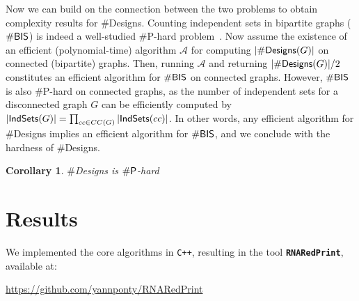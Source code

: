 \documentclass[twocolumn]{bmcart}%
\newtheorem{corollary}[theorem]{Corollary}
\newenvironment{proof}[1][]{\noindent Proof\ifthenelse{\equal{#1}{}}{}{ (#1)}.~}{}
\newcommand{\Design}[1]{{\sf Designs}^{\star}(#1)}
\newcommand{\NumDesign}{\ensuremath{\#}{\sf Designs}\xspace}
\newcommand{\IS}[1]{{\sf IndSets}(#1)}
\newcommand{\ourprog}{{\tt \bfseries{}\color{black!85}RNA\textcolor{red!70!black}{Red}Print}}
\newcommand{\citep}[1]{\cite{#1}}
\begin{document}
Now we can build on the connection between the two problems to obtain complexity results for \NumDesign. Counting independent sets in bipartite graphs ($\#{\sf BIS}$) is indeed a well-studied \#{\sf P}-hard problem~\citep{Ge2012}. Now assume the existence of an efficient (polynomial-time) algorithm $\mathcal{A}$ for computing $|\NumDesign(G)|$ on connected (bipartite) graphs. Then, running $\mathcal{A}$ and returning $|\NumDesign(G)|/2$ constitutes an efficient algorithm for $\#{\sf BIS}$ on connected graphs.
However, $\#{\sf BIS}$ is also \#{\sf P}-hard on connected graphs, as the number of independent sets for a disconnected graph $G$ can be efficiently computed by $|\IS{G}|=\prod_{cc\in CC(G)} |\IS{cc}|$. In other words, any efficient algorithm for \NumDesign implies an efficient algorithm for $\#{\sf BIS}$, and we conclude with the hardness of \NumDesign.

\begin{corollary}
  \NumDesign is $\#{\sf P}$-hard
\end{corollary}





\section*{Results}\label{sec:results}

We implemented the core algorithms in \texttt{C++}, resulting in the tool
\ourprog{}, available at: 

{\centering \url{https://github.com/yannponty/RNARedPrint}\\[.3em]}
\end{document}
